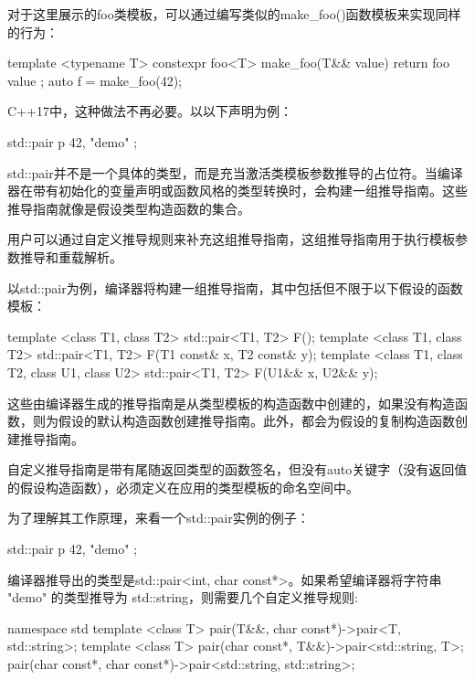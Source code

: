 对于这里展示的foo类模板，可以通过编写类似的make\_foo()函数模板来实现同样的行为：

\begin{cpp}
template <typename T>
constexpr foo<T> make_foo(T&& value)
{
    return foo{ value };
}
auto f = make_foo(42);
\end{cpp}

C++17中，这种做法不再必要。以以下声明为例：

\begin{cpp}
std::pair p{ 42, "demo" };
\end{cpp}

std::pair并不是一个具体的类型，而是充当激活类模板参数推导的占位符。当编译器在带有初始化的变量声明或函数风格的类型转换时，会构建一组推导指南。这些推导指南就像是假设类型构造函数的集合。

用户可以通过自定义推导规则来补充这组推导指南，这组推导指南用于执行模板参数推导和重载解析。

以std::pair为例，编译器将构建一组推导指南，其中包括但不限于以下假设的函数模板：

\begin{cpp}
template <class T1, class T2>
std::pair<T1, T2> F();
template <class T1, class T2>
std::pair<T1, T2> F(T1 const& x, T2 const& y);
template <class T1, class T2, class U1, class U2>
std::pair<T1, T2> F(U1&& x, U2&& y);
\end{cpp}

这些由编译器生成的推导指南是从类型模板的构造函数中创建的，如果没有构造函数，则为假设的默认构造函数创建推导指南。此外，都会为假设的复制构造函数创建推导指南。

自定义推导指南是带有尾随返回类型的函数签名，但没有auto关键字（没有返回值的假设构造函数），必须定义在应用的类型模板的命名空间中。

为了理解其工作原理，来看一个std::pair实例的例子：

\begin{cpp}
std::pair p{ 42, "demo" };
\end{cpp}

编译器推导出的类型是std::pair<int, char const*>。如果希望编译器将字符串 "demo" 的类型推导为 std::string，则需要几个自定义推导规则:

\begin{cpp}
namespace std {
    template <class T>
    pair(T&&, char const*)->pair<T, std::string>;
    template <class T>
    pair(char const*, T&&)->pair<std::string, T>;
    pair(char const*, char const*)->pair<std::string, std::string>;
}
\end{cpp}

